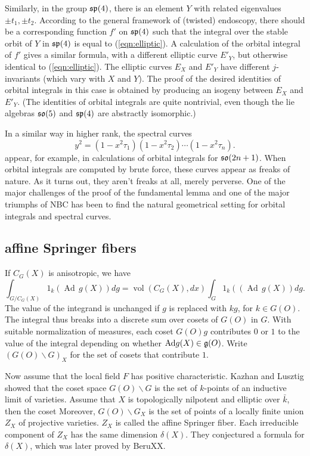 \documentclass[brochure,english,12pt]{bourbaki}
\def\op#1{{\operatorname{#1}}}
\def\so{\frak{so}}
\def\sp{\frak{sp}}
\def\g{\frak{g}}
\def\b{\backslash }
\begin{document}
Similarly, in the group $\sp(4)$, there is an element $Y$ with related eigenvalues $\pm
t_1,\pm t_2$.  According to the general framework of (twisted) endoscopy, there
should be a corresponding function $f'$ on $\sp(4)$ such that the
integral over the stable orbit of $Y$ in $\sp(4)$ is equal to
(\ref{eqn:elliptic}).  A calculation of the orbital integral of $f'$ gives a similar formula, with
a different elliptic curve $E'_Y$, but otherwise identical to (\ref{eqn:elliptic}).
The elliptic curves $E_X$ and $E'_Y$
have different $j$-invariants (which vary with $X$ and $Y$).  The
proof of the desired identities of orbital integrals in this case is
obtained by producing an isogeny between $E_X$ and $E'_Y$.  (The identities of orbital integrals are quite
nontrivial, even though the lie algebras $\so(5)$ and $\sp(4)$ are abstractly isomorphic.)

In a similar way in higher rank,  the spectral curves
\[
y^2 = (1-x^2 \tau_1)(1-x^2 \tau_2)\cdots (1-x^2 \tau_n).
\]
appear, for example, in calculations of orbital integrals for
$\so(2n+1)$.  When orbital integrals are computed by brute force,
these curves appear as freaks of nature.  As it turns
out, they aren't freaks at all, merely perverse.  One of the major
challenges of the proof of the fundamental lemma and one of the major
triumphs of NBC has been to find the natural geometrical setting for
orbital integrals and spectral curves.

\subsection{affine Springer fibers}



If $C_G(X)$ is anisotropic, we have
\[
\int_{G/C_G(X)} 1_k (\op{Ad}\, g(X)) dg = \op{vol}(C_G(X),dx)\int_G 1_k (\op(\op{Ad}\,g(X)) dg.
\]
The value of the integrand is unchanged if $g$ is replaced with $k g$,
for $k\in G(O)$.  The integral thus breaks into a discrete sum over
cosets of $G(O)$ in $G$.  With suitable normalization of measures,
each coset $G(O)g$ contributes $0$ or $1$ to the value of the integral
depending on whether $\op{Ad}g(X) \in \g(O)$.  Write $(G(O)\b G)_X$
for the set of cosets that contribute $1$.

Now assume that the local field $F$ has positive characteristic.
Kazhan and Lusztig showed that the coset space $G(O)\b G$ is the set of
$k$-points of an inductive limit of varieties.  Assume that $X$ is
topologically nilpotent and elliptic over $\bar k$, then the coset
Moreover, $G(O)\b G_X$ is the set of points of a locally finite union
$Z_X$ of projective varieties.  $Z_X$ is called the affine Springer
fiber.  Each irreducible component of $Z_X$ has the same dimension
$\delta(X)$.  They conjectured a formula for $\delta(X)$, which was
later proved by BeruXX.
\end{document}
